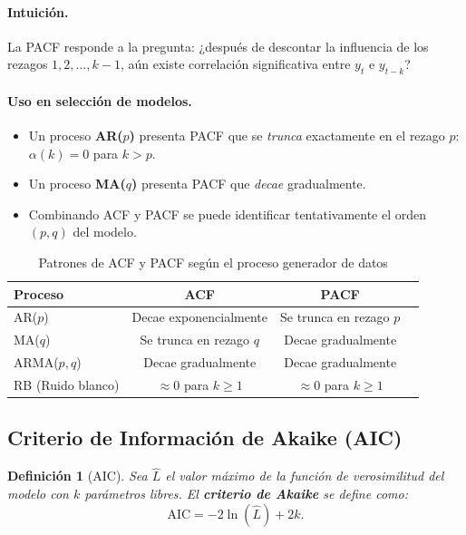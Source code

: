 \documentclass[12pt,a4paper]{article}
\newtheorem{definicion}{Definición}[section]
\begin{document}
\paragraph{Intuición.}
La PACF responde a la pregunta: ¿después de descontar la influencia de los rezagos
$1, 2, \ldots, k-1$, aún existe correlación significativa entre $y_t$ e $y_{t-k}$?

\paragraph{Uso en selección de modelos.}
\begin{itemize}
  \item Un proceso \textbf{AR($p$)} presenta PACF que se \textit{trunca} exactamente en el
        rezago $p$: $\alpha(k) = 0$ para $k > p$.
  \item Un proceso \textbf{MA($q$)} presenta PACF que \textit{decae} gradualmente.
  \item Combinando ACF y PACF se puede identificar tentativamente el orden $(p,q)$ del modelo.
\end{itemize}

\begin{table}[H]
\centering
\caption{Patrones de ACF y PACF según el proceso generador de datos}
\label{tab:acf_pacf}
\begin{tabular}{lccc}
\toprule
\textbf{Proceso} & \textbf{ACF} & \textbf{PACF} \\
\midrule
AR($p$) & Decae exponencialmente & Se trunca en rezago $p$ \\
MA($q$) & Se trunca en rezago $q$ & Decae gradualmente \\
ARMA($p,q$) & Decae gradualmente & Decae gradualmente \\
RB (Ruido blanco) & $\approx 0$ para $k \geq 1$ & $\approx 0$ para $k \geq 1$ \\
\bottomrule
\end{tabular}
\end{table}

\subsection{Criterio de Información de Akaike (AIC)}

\begin{definicion}[AIC]
Sea $\hat{L}$ el valor máximo de la función de verosimilitud del modelo con $k$ parámetros
libres. El \textbf{criterio de Akaike} se define como:
\[
  \mathrm{AIC} = -2\ln(\hat{L}) + 2k.
\]
\end{definicion}
\end{document}
